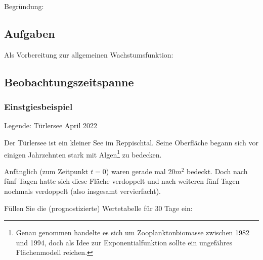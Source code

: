 Begründung:
\newpage


\newpage

\subsection*{Aufgaben}

  Als Vorbereitung zur allgemeinen Wachstumsfunktion:


\newpage

\subsection{Beobachtungszeitspanne}
\subsubsection{Einstgiesbeispiel}
\begin{center}{\small Legende: Türlersee April 2022}\end{center}

Der Türlersee ist ein kleiner See im Reppischtal. Seine Oberfläche
begann sich vor einigen Jahrzehnten stark mit Algen\footnote{Genau
  genommen handelte es sich um Zooplanktonbiomasse zwischen 1982 und 1994, doch als
  Idee zur Exponentialfunktion sollte ein ungefähres Flächenmodell reichen.} zu bedecken.

Anfänglich (zum Zeitpunkt $t=0$) waren gerade mal 20$m^2$ bedeckt. Doch nach fünf Tagen hatte sich diese Fläche verdoppelt und nach weiteren fünf Tagen nochmals verdoppelt (also insgesamt vervierfacht).

Füllen Sie die (prognostizierte) Wertetabelle für 30 Tage ein:

